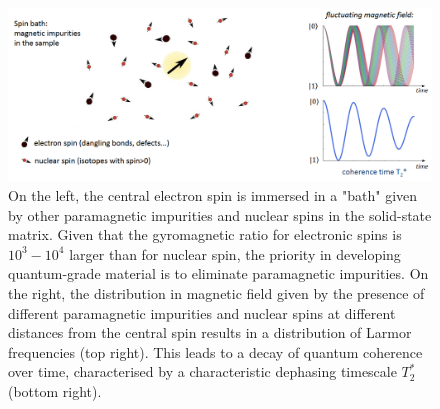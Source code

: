 \documentclass[a4paper,11pt]{article}
\begin{document}
\begin{figure}[h]
\centering
\includegraphics[width = 1\textwidth]{figures/T2_star.png}
\caption{On the left, the central electron spin is immersed in a "bath" given by other paramagnetic impurities and nuclear spins in the solid-state matrix. Given that the gyromagnetic ratio for electronic spins is $10^3-10^4$ larger than for nuclear spin, the priority in developing quantum-grade material is to eliminate paramagnetic impurities. On the right, the distribution in magnetic field given by the presence of different paramagnetic impurities and nuclear spins at different distances from the central spin results in a distribution of Larmor frequencies (top right). This leads to a decay of quantum coherence over time, characterised by a characteristic dephasing timescale $T_2^*$ (bottom right).}
\label{fig:T2_star}
\end{figure}
\end{document}
